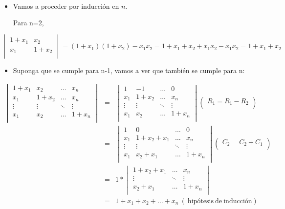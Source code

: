 \documentclass[
]{article}
\begin{document}
\begin{itemize}
\item
  Vamos a proceder por inducción en \(n\).

  Para n=2,
\end{itemize}

\[\begin{vmatrix}
1 + x_{1} & x_{2} \\
x_{1} & 1 + x_{2} \\
\end{vmatrix} = (1 + x_{1})(1 + x_{2}) - x_{1}x_{2} = 1 + x_{1} + x_{2} + x_{1}x_{2} - x_{1}x_{2} = 1 + x_{1} + x_{2}\]

\begin{itemize}
\item
  Suponga que se cumple para n-1, vamos a ver que también se cumple para
  n:
\end{itemize}

\[\begin{matrix}
\begin{vmatrix}
1 + x_{1} & x_{2} & \ldots & x_{n} \\
x_{1} & 1 + x_{2} & \ldots & x_{n} \\
 \vdots & \vdots & \ddots & \vdots \\
x_{1} & x_{2} & \ldots & 1 + x_{n} \\
\end{vmatrix} & = & \begin{vmatrix}
1 & - 1 & \ldots & 0 \\
x_{1} & 1 + x_{2} & \ldots & x_{n} \\
 \vdots & \vdots & \ddots & \vdots \\
x_{1} & x_{2} & \ldots & 1 + x_{n} \\
\end{vmatrix}\begin{pmatrix}
R_{1} = R_{1} - R_{2} \\
\end{pmatrix} \\
 & = & \begin{vmatrix}
1 & 0 & \ldots & 0 \\
x_{1} & 1 + x_{2} + x_{1} & \ldots & x_{n} \\
 \vdots & \vdots & \ddots & \vdots \\
x_{1} & x_{2} + x_{1} & \ldots & 1 + x_{n} \\
\end{vmatrix}\begin{pmatrix}
C_{2} = C_{2} + C_{1} \\
\end{pmatrix} \\
 & = & 1*\begin{vmatrix}
1 + x_{2} + x_{1} & \ldots & x_{n} \\
 \vdots & \ddots & \vdots \\
x_{2} + x_{1} & \ldots & 1 + x_{n} \\
\end{vmatrix} \\
 & = & 1 + x_{1} + x_{2} + \ldots + x_{n}\ (\mathrm{\ hipótesis\ de\ inducción}) \\
\end{matrix}\]
\end{document}
